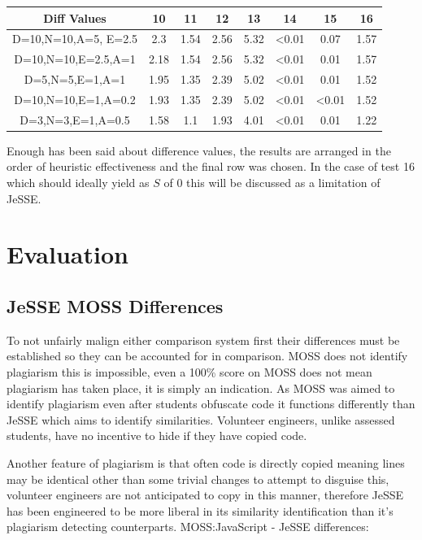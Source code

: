 \documentclass[jou,apacite]{apa6}
\begin{document}
\setlength{\tabcolsep}{1pt}
\renewcommand{\arraystretch}{1.5}

\begin{center}
 \begin{tabular}{||c c c c c c c c ||} 
 \hline
 Diff Values & 10 & 11 & 12 & 13 & 14 & 15 & 16 \\ [-0.2ex] 
 \hline\hline
 D=10,N=10,A=5, E=2.5 & 2.3 & 1.54 & 2.56 & 5.32 & <0.01 & 0.07 & 1.57 \\ 
 \hline
 D=10,N=10,E=2.5,A=1  & 2.18 & 1.54 & 2.56 & 5.32 & <0.01 & 0.01 & 1.57  \\
 \hline
 D=5,N=5,E=1,A=1  & 1.95 & 1.35 & 2.39 & 5.02 & <0.01 & 0.01 & 1.52  \\
 \hline
  D=10,N=10,E=1,A=0.2  & 1.93 & 1.35 & 2.39 & 5.02 & <0.01 & <0.01 & 1.52  \\
  \hline
    D=3,N=3,E=1,A=0.5  & 1.58 & 1.1 & 1.93 & 4.01 & <0.01 & 0.01 & 1.22 \\
  \hline
\end{tabular}
\end{center}

Enough has been said about difference values, the results are arranged in the order of heuristic effectiveness and the final row was chosen. In the case of test 16 which should ideally yield as $S$ of 0 this will be discussed as a limitation of JeSSE.

\clearpage

\section{Evaluation}
\subsection{JeSSE MOSS Differences}
To not unfairly malign either comparison system first their differences must be established so they can be accounted for in comparison.  MOSS does not identify plagiarism this is impossible, even a 100\% score on MOSS does not mean plagiarism has taken place, it is simply an indication. As MOSS was aimed to identify plagiarism even after students obfuscate code it functions differently than JeSSE which aims to identify similarities. Volunteer engineers, unlike assessed students,  have no incentive to hide if they have copied code.

Another feature of plagiarism is that often code is directly copied meaning lines may be identical other than some trivial changes to attempt to disguise this, volunteer engineers are not anticipated to copy in this manner, therefore JeSSE has been engineered to be more liberal in its similarity identification than it’s plagiarism detecting counterparts. MOSS:JavaScript - JeSSE differences: 
\end{document}
